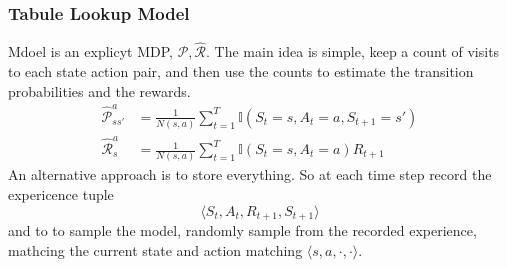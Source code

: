 \subsubsection{Tabule Lookup Model}
Mdoel is an explicyt MDP, \(\hat{\mathcal{P}}, \hat{\mathcal{R}}\). The main idea is simple, keep a count of
visits to each state action pair, and then use the counts to estimate the transition probabilities and the rewards.
\[
    \begin{aligned}
        \hat{\mathcal{P}}_{ss'}^a &= \frac{1}{N(s,a)} \sum_{t=1}^T \mathbb{I}(S_t = s, A_t = a, S_{t+1} = s') \\
        \hat{\mathcal{R}}_s^a &= \frac{1}{N(s,a)} \sum_{t=1}^T \mathbb{I}(S_t = s, A_t = a) R_{t+1}
    \end{aligned}  
\]
An alternative approach is to store everything. So at each time step record the expericence tuple
\[
    \langle S_t, A_t, R_{t+1}, S_{t+1} \rangle  
\]
and to to sample the model, randomly sample from the recorded experience, mathcing the
current state and action matching \(\langle s,a ,\cdot, \cdot \rangle\). 

